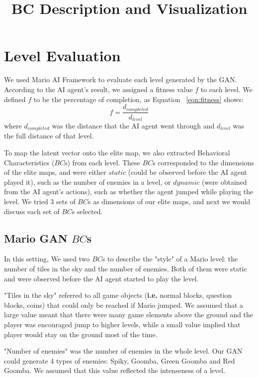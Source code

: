 \documentclass[conference]{IEEEtran}
\begin{document}
\title{BC Description and Visualization}
\maketitle

\section{Level Evaluation} \label{sec:LevelEvaluation}
We used Mario AI Framework to evaluate each level generated by the GAN. According to the AI agent's result, we assigned 
a fitness value $f$ to each level. We defined $f$ to be the percentage of completion, as Equation ~\ref{eqn:fitness}
shows:
\begin{equation}
    f=\frac{d_{completed}}{d_{level}}
    \label{eqn:fitness}
\end{equation}
where $d_{completed}$ was the distance that the AI agent went through and $d_{level}$ was the full distance of that level. 

To map the latent vector onto the elite map, we also extracted Behavioral Characteristics ($BC$s) from each level. These
$BC$s corresponded to the dimensions of the elite maps, and were either $static$ (could be observed before the AI 
agent played it), such as the number of enemies in a level, or $dynamic$ (were obtained from the AI agent's 
actions), such as whether the agent jumped while playing the level. We tried 3 sets of $BC$s as dimensions of 
our elite maps, and next we would discuss each set of $BC$s selected.

\subsection{Mario GAN $BC$s}
In this setting, We used two $BC$s to describe the "style" of a Mario level: the number of tiles in the sky and 
the number of enemies. Both of them were static and were observed before the AI agent started to play the level.

"Tiles in the sky" referred to all game objects (\textbf{i.e. }normal blocks, question blocks, coins) 
that could only be reached if Mario jumped. We assumed that a large value meant that there were many game elements 
above the ground and the player was encouraged jump to higher levels, while a small value implied that player would 
stay on the ground most of the time. 

"Number of enemies" was the number of enemies in the whole level. Our GAN could generate 4 types of enemies: 
Spiky, Goomba, Green Goomba and Red Goomba. We assumed that this value reflected the intenseness of a level. 
\end{document}
